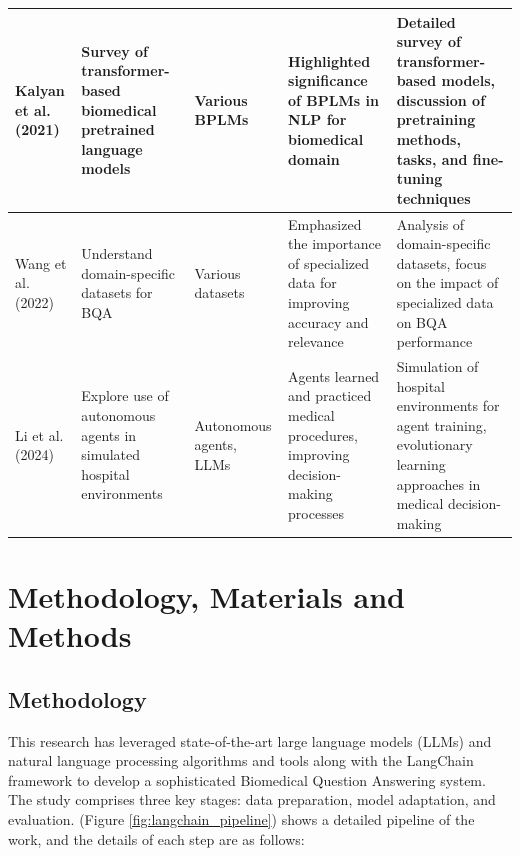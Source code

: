 \documentclass[onecolumn, conference]{IEEEtran}
\begin{document}
\begin{table}[ht]
\begin{tabularx}{\textwidth}{|X|X|X|X|X|}
    \hline
    Kalyan et al. (2021) \cite{Kalyan2021}        & Survey of transformer-based biomedical pretrained language models   & Various BPLMs                  & Highlighted significance of BPLMs in NLP for biomedical domain                             & Detailed survey of transformer-based models, discussion of pretraining methods, tasks, and fine-tuning techniques   \\
    \hline
    Wang et al. (2022) \cite{Wang2022}            & Understand domain-specific datasets for BQA                         & Various datasets               & Emphasized the importance of specialized data for improving accuracy and relevance         & Analysis of domain-specific datasets, focus on the impact of specialized data on BQA performance                    \\
    \hline
    Li et al. (2024) \cite{Li2024}                & Explore use of autonomous agents in simulated hospital environments & Autonomous agents, LLMs        & Agents learned and practiced medical procedures, improving decision-making processes       & Simulation of hospital environments for agent training, evolutionary learning approaches in medical decision-making \\
    \hline
  \end{tabularx}
\end{table}

\section{Methodology, Materials and Methods}

\subsection{Methodology}
This research has leveraged state-of-the-art large language models (LLMs) and natural language processing algorithms and tools along with the LangChain framework to develop a sophisticated Biomedical Question Answering system. The study comprises three key stages: data preparation, model adaptation, and evaluation. (Figure \ref{fig:langchain_pipeline}) shows a detailed pipeline of the work, and the details of each step are as follows:
\end{document}

